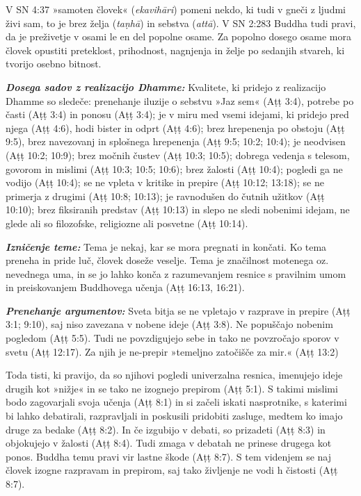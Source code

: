 V SN 4:37 »samoten človek« (\emph{ekavihāri}) pomeni nekdo, ki tudi v
gneči z ljudmi živi sam, to je brez želja (\emph{taṇhā}) in sebstva
(\emph{attā}). V SN 2:283 Buddha tudi pravi, da je preživetje v osami le
en del popolne osame. Za popolno dosego osame mora človek opustiti
preteklost, prihodnost, nagnjenja in želje po sedanjih stvareh, ki
tvorijo osebno bitnost.

\textbf{\emph{Dosega sadov z realizacijo Dhamme:} }Kvalitete, ki pridejo
z realizacijo Dhamme so sledeče: prenehanje iluzije o sebstvu »Jaz sem«
(Aṭṭ 3:4), potrebe po časti (Aṭṭ 3:4) in ponosu (Aṭṭ 3:4); je v miru med
vsemi idejami, ki pridejo pred njega (Aṭṭ 4:6), hodi bister in odprt
(Aṭṭ 4:6); brez hrepenenja po obstoju (Aṭṭ 9:5), brez navezovanj in
splošnega hrepenenja (Aṭṭ 9:5; 10:2; 10:4); je neodvisen (Aṭṭ 10:2;
10:9); brez močnih čustev (Aṭṭ 10:3; 10:5); dobrega vedenja s telesom,
govorom in mislimi (Aṭṭ 10:3; 10:5; 10:6); brez žalosti (Aṭṭ 10:4);
pogledi ga ne vodijo (Aṭṭ 10:4); se ne vpleta v kritike in prepire (Aṭṭ
10:12; 13:18); se ne primerja z drugimi (Aṭṭ 10:8; 10:13); je ravnodušen
do čutnih užitkov (Aṭṭ 10:10); brez fiksiranih predstav (Aṭṭ 10:13) in
slepo ne sledi nobenimi idejam, ne glede ali so filozofske, religiozne
ali posvetne (Aṭṭ 10:14).

\textbf{\emph{Izničenje teme:} }Tema je nekaj, kar se mora pregnati in
končati. Ko tema preneha in pride luč, človek doseže veselje. Tema je
značilnost motenega oz. nevednega uma, in se jo lahko konča z
razumevanjem resnice s pravilnim umom in preiskovanjem Buddhovega učenja
(Aṭṭ 16:13, 16:21).

\textbf{\emph{Prenehanje argumentov:} }Sveta bitja se ne vpletajo v
razprave in prepire (Aṭṭ 3:1; 9:10), saj niso zavezana v nobene ideje
(Aṭṭ 3:8). Ne popuščajo nobenim pogledom (Aṭṭ 5:5). Tudi ne povzdigujejo
sebe in tako ne povzročajo sporov v svetu (Aṭṭ 12:17). Za njih je
ne-prepir »temeljno zatočišče za mir.« (Aṭṭ 13:2)

Toda tisti, ki pravijo, da so njihovi pogledi univerzalna resnica,
imenujejo ideje drugih kot »nižje« in se tako ne izognejo prepirom (Aṭṭ
5:1). S takimi mislimi bodo zagovarjali svoja učenja (Aṭṭ 8:1) in si
začeli iskati nasprotnike, s katerimi bi lahko debatirali, razpravljali
in poskusili pridobiti zasluge, medtem ko imajo druge za bedake (Aṭṭ
8:2). In če izgubijo v debati, so prizadeti (Aṭṭ 8:3) in objokujejo v
žalosti (Aṭṭ 8:4). Tudi zmaga v debatah ne prinese drugega kot ponos.
Buddha temu pravi vir lastne škode (Aṭṭ 8:7). S tem videnjem se naj
človek izogne razpravam in prepirom, saj tako življenje ne vodi h
čistosti (Aṭṭ 8:7).

